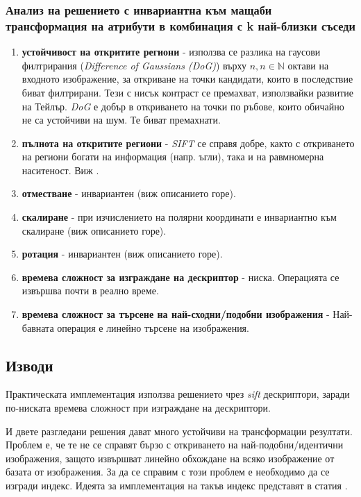 \documentclass[a4paper,12pt]{article}
\begin{document}
\subsubsection{Анализ на решението с инвариантна към мащаби трансформация на атрибути в комбинация с k най-близки съседи}

\begin{enumerate}
    \item \textbf{устойчивост на откритите региони} - използва се разлика на гаусови филтрирания (\textit{Difference of Gaussians (DoG)}) върху $n, n \in \mathbb{N}$ октави на входното изображение, за откриване на точки кандидати, които в последствие биват филтрирани. Тези с нисък контраст се премахват, използвайки развитие на Тейлър. \textit{DoG} е добър в откриването на точки по ръбове, които обичайно не са устойчиви на шум. Те биват премахнати.
    \item \textbf{пълнота на откритите региони} - \textit{SIFT} се справя добре, както с откриването на региони богати на информация (напр. ъгли), така и на равмномерна наситеност. Виж \cite{sift}.
    \item \textbf{отместване} - инвариантен (виж описанието горе).
    \item \textbf{скалиране} - при изчислението на полярни координати е инвариантно към скалиране (виж описанието горе).
    \item \textbf{ротация} - инвариантен (виж описанието горе). 
    \item \textbf{времева сложност за изграждане на дескриптор} - ниска. Операцията се извършва почти в реално време.
    \item \textbf{времева сложност за търсене на най-сходни/подобни изображения} - Най-бавната операция е линейно търсене на изображения.
\end{enumerate}

\subsection{Изводи}

Практическата имплементация използва решението чрез \textit{sift} дескриптори, заради по-ниската времева сложност при изграждане на дескриптори.

\bigbreak

И двете разгледани решения дават много устойчиви на трансформации резултати. Проблем е, че те не се справят бързо с откриването на най-подобни/идентични изображения, защото извършват линейно обхождане на всяко изображение от базата от изображения. За да се справим с този проблем е необходимо да се изгради индекс. Идеята за имплементация на такъв индекс представят в статия \cite{vocabularytree}.
\end{document}
